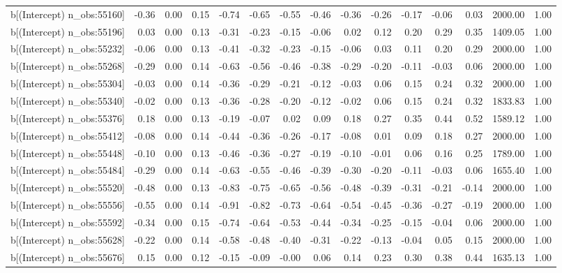 \begin{table}[ht]
\begin{tabular}{rrrrrrrrrrrrrrr}
  b[(Intercept) n\_obs:55160] & -0.36 & 0.00 & 0.15 & -0.74 & -0.65 & -0.55 & -0.46 & -0.36 & -0.26 & -0.17 & -0.06 & 0.03 & 2000.00 & 1.00 \\ 
  b[(Intercept) n\_obs:55196] & 0.03 & 0.00 & 0.13 & -0.31 & -0.23 & -0.15 & -0.06 & 0.02 & 0.12 & 0.20 & 0.29 & 0.35 & 1409.05 & 1.00 \\ 
  b[(Intercept) n\_obs:55232] & -0.06 & 0.00 & 0.13 & -0.41 & -0.32 & -0.23 & -0.15 & -0.06 & 0.03 & 0.11 & 0.20 & 0.29 & 2000.00 & 1.00 \\ 
  b[(Intercept) n\_obs:55268] & -0.29 & 0.00 & 0.14 & -0.63 & -0.56 & -0.46 & -0.38 & -0.29 & -0.20 & -0.11 & -0.03 & 0.06 & 2000.00 & 1.00 \\ 
  b[(Intercept) n\_obs:55304] & -0.03 & 0.00 & 0.14 & -0.36 & -0.29 & -0.21 & -0.12 & -0.03 & 0.06 & 0.15 & 0.24 & 0.32 & 2000.00 & 1.00 \\ 
  b[(Intercept) n\_obs:55340] & -0.02 & 0.00 & 0.13 & -0.36 & -0.28 & -0.20 & -0.12 & -0.02 & 0.06 & 0.15 & 0.24 & 0.32 & 1833.83 & 1.00 \\ 
  b[(Intercept) n\_obs:55376] & 0.18 & 0.00 & 0.13 & -0.19 & -0.07 & 0.02 & 0.09 & 0.18 & 0.27 & 0.35 & 0.44 & 0.52 & 1589.12 & 1.00 \\ 
  b[(Intercept) n\_obs:55412] & -0.08 & 0.00 & 0.14 & -0.44 & -0.36 & -0.26 & -0.17 & -0.08 & 0.01 & 0.09 & 0.18 & 0.27 & 2000.00 & 1.00 \\ 
  b[(Intercept) n\_obs:55448] & -0.10 & 0.00 & 0.13 & -0.46 & -0.36 & -0.27 & -0.19 & -0.10 & -0.01 & 0.06 & 0.16 & 0.25 & 1789.00 & 1.00 \\ 
  b[(Intercept) n\_obs:55484] & -0.29 & 0.00 & 0.14 & -0.63 & -0.55 & -0.46 & -0.39 & -0.30 & -0.20 & -0.11 & -0.03 & 0.06 & 1655.40 & 1.00 \\ 
  b[(Intercept) n\_obs:55520] & -0.48 & 0.00 & 0.13 & -0.83 & -0.75 & -0.65 & -0.56 & -0.48 & -0.39 & -0.31 & -0.21 & -0.14 & 2000.00 & 1.00 \\ 
  b[(Intercept) n\_obs:55556] & -0.55 & 0.00 & 0.14 & -0.91 & -0.82 & -0.73 & -0.64 & -0.54 & -0.45 & -0.36 & -0.27 & -0.19 & 2000.00 & 1.00 \\ 
  b[(Intercept) n\_obs:55592] & -0.34 & 0.00 & 0.15 & -0.74 & -0.64 & -0.53 & -0.44 & -0.34 & -0.25 & -0.15 & -0.04 & 0.06 & 2000.00 & 1.00 \\ 
  b[(Intercept) n\_obs:55628] & -0.22 & 0.00 & 0.14 & -0.58 & -0.48 & -0.40 & -0.31 & -0.22 & -0.13 & -0.04 & 0.05 & 0.15 & 2000.00 & 1.00 \\ 
  b[(Intercept) n\_obs:55676] & 0.15 & 0.00 & 0.12 & -0.15 & -0.09 & -0.00 & 0.06 & 0.14 & 0.23 & 0.30 & 0.38 & 0.44 & 1635.13 & 1.00 \\ 

\end{tabular}
\end{table}
